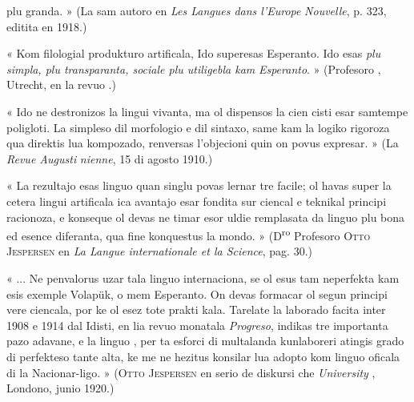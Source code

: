 \begin{VUpage}[237]{}
\vspace*{-9.0mm}
\VUpageSerre{8.26pt}{7.95pt}

\VUcontinue
plu granda. » (La sam autoro en \textit{Les Langues dans l'Europe}\nl
\textit{Nouvelle}, p. 323, editita en 1918.)

« Kom filologial produkturo artificala, Ido superesas Esperanto.\nl
Ido esas \textit{plu simpla, plu transparanta, sociale plu utiligebla kam}\nl
\textit{Esperanto}. » (Profesoro \textsc{}, Utrecht, en la revuo .)\parplein

« Ido ne destronizos la lingui vivanta, ma ol dispensos la cien\cc
cisti esar samtempe poligloti. La simpleso dil morfologio e dil\nl
sintaxo, same kam la logiko rigoroza qua direktis lua kompozado,\nl
renversas l'objecioni quin on povus expresar. \cc
{} » (La \textit{Revue Augusti}\cc
\textit{nienne}, 15 di agosto 1910.)

« La rezultajo esas linguo quan singlu povas lernar tre facile; ol\nl
havas super la cetera lingui artificala ica avantajo esar fondita sur\nl
ciencal e teknikal principi racionoza, e konseque ol devas ne timar\nl
esor uldie remplasata da linguo plu bona ed esence diferanta, qua\nl
fine konquestus la mondo. » (D\textsuperscript{ro} Profesoro \textsc{Otto Jespersen} en\nl
\textit{La Langue internationale et la Science}, pag. 30.)

« ... Ne penvalorus uzar tala linguo internaciona, se ol esus tam\nl
neperfekta kam esis exemple Volapük, o mem Esperanto. On devas\nl
formacar ol segun principi vere ciencala, por ke ol esez tote prakti\cc
kala. Tarelate la laborado facita inter 1908 e 1914 dal Idisti, en\nl
lia revuo monatala \textit{Progreso}, indikas tre importanta pazo adavane,\nl
e la linguo , per ta esforci di multalanda kunlaboreri atingis\nl
grado di perfekteso tante alta, ke me ne hezitus konsilar lua adopto\nl
kom linguo oficala di la Nacionar-ligo. » (\textsc{Otto Jespersen} en serio\nl
de diskursi che \textit{University }, Londono, junio 1920.)


\end{VUpage}
